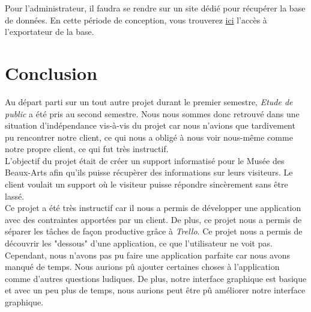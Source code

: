 \documentclass[12]{report}
\begin{document}
  Pour l'administrateur, il faudra se rendre sur un site dédié pour récupérer la base de données.
  En cette période de conception, vous trouverez \href{http://sullyvan.tremor.emi.u-bordeaux.fr/script_php/DB_online.php}{ici} l'accès à l'exportateur de la base.

  \chapter{Conclusion}

  Au départ parti sur un tout autre projet durant le premier semestre, \emph{Etude de public} a été pris au second semestre. Nous nous sommes donc retrouvé dans une situation d'indépendance vis-à-vis du projet car nous n'avions que tardivement pu rencontrer notre client, ce qui nous a obligé à nous voir nous-même comme notre propre client, ce qui fut très instructif. \\

  L'objectif du projet était de créer un support informatisé pour le Musée des Beaux-Arts afin qu'ils puisse récupèrer des informations sur leurs visiteurs. Le client voulait un support où le visiteur puisse répondre sincèrement sans être lassé.\\

  Ce projet a été très instructif car il nous a permis de développer une application avec des contraintes apportées par un client.
  De plus, ce projet nous a permis de séparer les tâches de façon productive grâce à \emph{Trello}.
  Ce projet nous a permis de découvrir les "dessous" d'une application, ce que l'utilisateur ne voit pas. \\

  Cependant, nous n'avons pas pu faire une application parfaite car nous avons manqué de temps.
  Nous aurions pû ajouter certaines choses à l'application comme d'autres questions ludiques.
  De plus, notre interface graphique est basique et avec un peu plus de temps, nous aurions peut être pû améliorer notre interface graphique.
\end{document}
